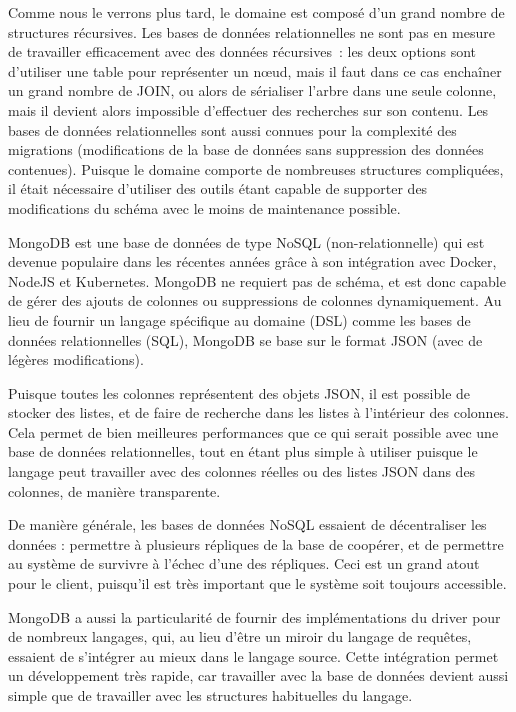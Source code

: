 \documentclass[11pt,french]{memoir}
\begin{document}
	Comme nous le verrons plus tard, le domaine est composé d’un grand nombre de structures récursives.
	Les bases de données relationnelles ne sont pas en mesure de travailler efficacement avec des données récursives~: les deux options sont d’utiliser une table pour représenter un nœud, mais il faut dans ce cas enchaîner un grand nombre de JOIN, ou alors de sérialiser l’arbre dans une seule colonne, mais il devient alors impossible d’effectuer des recherches sur son contenu.
	Les bases de données relationnelles sont aussi connues pour la complexité des migrations (modifications de la base de données sans suppression des données contenues).
	Puisque le domaine comporte de nombreuses structures compliquées, il était nécessaire d’utiliser des outils étant capable de supporter des modifications du schéma avec le moins de maintenance possible.

	\uparagraph
	MongoDB est une base de données de type NoSQL (non-relationnelle) qui est devenue populaire dans les récentes années grâce à son intégration avec Docker, NodeJS et Kubernetes.
	MongoDB ne requiert pas de schéma, et est donc capable de gérer des ajouts de colonnes ou suppressions de colonnes dynamiquement.
	Au lieu de fournir un langage spécifique au domaine (DSL) comme les bases de données relationnelles (SQL), MongoDB se base sur le format JSON (avec de légères modifications).

	Puisque toutes les colonnes représentent des objets JSON, il est possible de stocker des listes, et de faire de recherche dans les listes à l’intérieur des colonnes.
	Cela permet de bien meilleures performances que ce qui serait possible avec une base de données relationnelles, tout en étant plus simple à utiliser puisque le langage peut travailler avec des colonnes réelles ou des listes JSON dans des colonnes, de manière transparente.

	De manière générale, les bases de données NoSQL essaient de décentraliser les données : permettre à plusieurs répliques de la base de coopérer, et de permettre au système de survivre à l’échec d’une des répliques.
	Ceci est un grand atout pour le client, puisqu’il est très important que le système soit toujours accessible.

	\uparagraph
	MongoDB a aussi la particularité de fournir des implémentations du driver pour de nombreux langages, qui, au lieu d’être un miroir du langage de requêtes, essaient de s’intégrer au mieux dans le langage source.
	Cette intégration permet un développement très rapide, car travailler avec la base de données devient aussi simple que de travailler avec les structures habituelles du langage.
\end{document}
